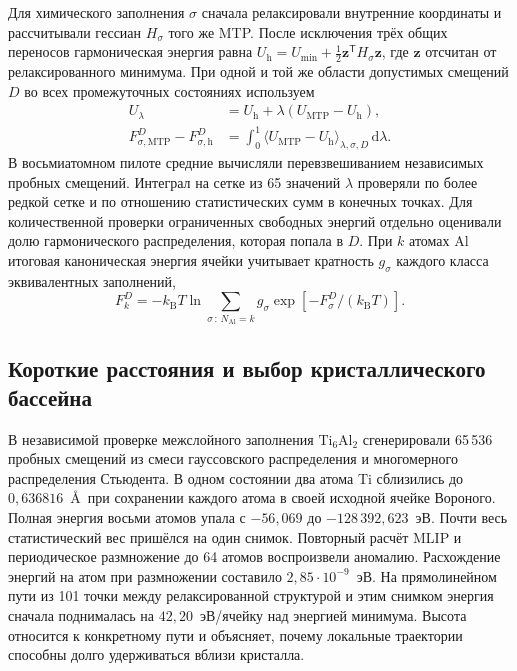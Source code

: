 \documentclass[11pt,a4paper]{article}
\begin{document}
Для химического заполнения $\sigma$ сначала релаксировали внутренние
координаты и рассчитывали гессиан $H_\sigma$ того же MTP. После исключения трёх
общих переносов гармоническая энергия равна
$U_{\mathrm h}=U_{\min}+\tfrac12\mathbf z^{\mathsf T}H_\sigma\mathbf z$,
где $\mathbf z$ отсчитан от релаксированного минимума. При одной и той же
области допустимых смещений $D$ во всех промежуточных состояниях используем
\begin{align}
 U_\lambda &= U_{\mathrm h}+\lambda(U_{\mathrm{MTP}}-U_{\mathrm h}),\\
 F_{\sigma,\mathrm{MTP}}^{D}-F_{\sigma,\mathrm h}^{D}
 &=\int_0^1
     \langle U_{\mathrm{MTP}}-U_{\mathrm h}\rangle_{\lambda,\sigma,D}
     \,\mathrm d\lambda .
\end{align}
В восьмиатомном пилоте средние вычисляли перевзвешиванием независимых пробных
смещений. Интеграл на сетке из 65 значений $\lambda$ проверяли по более редкой
сетке и по отношению статистических сумм в конечных точках. Для количественной
проверки ограниченных свободных энергий отдельно оценивали долю гармонического
распределения, которая попала в $D$. При $k$ атомах Al итоговая каноническая
энергия ячейки учитывает кратность $g_\sigma$ каждого класса эквивалентных
заполнений,
\[
 F_k^D=-k_{\mathrm B}T\ln
   \sum_{\sigma\,:\,N_{\mathrm{Al}}=k}g_\sigma
     \exp[-F_\sigma^D/(k_{\mathrm B}T)] .
\]

\subsection{Короткие расстояния и выбор кристаллического бассейна}

В независимой проверке межслойного заполнения $\mathrm{Ti}_6\mathrm{Al}_2$
сгенерировали 65\,536 пробных смещений из смеси гауссовского распределения
и многомерного распределения Стьюдента. В одном состоянии два атома Ti
сблизились до $0{,}636816$~\AA\ при сохранении каждого атома в своей исходной
ячейке Вороного. Полная энергия восьми атомов упала с $-56{,}069$ до
$-128\,392{,}623$~эВ. Почти весь статистический вес пришёлся на один снимок.
Повторный расчёт MLIP и периодическое размножение до 64 атомов воспроизвели
аномалию. Расхождение энергий на атом при размножении составило
$2{,}85\cdot10^{-9}$~эВ. На прямолинейном пути из 101 точки между релаксированной
структурой и этим снимком энергия сначала поднималась на $42{,}20$~эВ/ячейку
над энергией минимума. Высота относится к конкретному пути и объясняет, почему
локальные траектории способны долго удерживаться вблизи кристалла.
\end{document}
